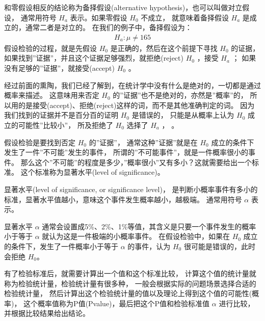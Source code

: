 \documentclass[letterpaper,10pt,english]{sphinxmanual}
\begin{document}
和零假设相反的结论称为备择假设(alternative hypothesis)，也可以叫做对立假设，
通常用符号 \(H_a\) 表示。如果零假设 \(H_0\) 不成立，
就意味着备择假设 \(H_a\) 是成立的，通常二者是对立的。
在我们的例子中，备择假设为：
\begin{equation}\label{equation:推断与检验/content:推断与检验/content:84}
\begin{split}H_a: \mu \neq 165\end{split}
\end{equation}
假设检验的过程，就是先假设 \(H_0\) 是正确的，然后在这个前提下寻找  \(H_0\) 的证据，
如果找到”证据”，并且这个证据足够强烈，就拒绝(reject) \(H_0\) ，接受 \(H_a\) ；
如果没有足够的”证据”，就接受(accept) \(H_0\) 。

经过前面的熏陶，我们已经了解到，在统计学中没有什么是绝对的，一切都是通过概率来描述。
这意味用来否定 \(H_0\) 的”证据”也不是绝对的，亦然是”概率”的，
所以用的是接受(accept)、拒绝(reject)这样的词，而不是其他准确判定的词。
因为我们找到的证据并不是百分百的证明 \(H_0\) 是错误的，
只能是从概率上认为 \(H_0\) 成立的可能性”比较小”，
所及拒绝了 \(H_0\) 选择了  \(H_a\) ，
。


假设检验是要找到否定 \(H_0\) 的”证据”，
通常这种”证据”就是在 \(H_0\) 成立的条件下发生了一件”不可能”发生的事件，
所谓的”不可能事件”，就是一件概率很小的事件。
那么这个”不可能”的程度是多少，”概率很小”又有多小？这就需要给出一个标准。
这个标准称为显著水平(level of significance)。

\begin{sphinxShadowBox}

显著水平(level of significance, or significance level)，
是判断小概率事件有多小的标准，显著水平值越小，意味这个事件发生概率越小，越极端。
通常用符号 \(\alpha\) 表示。
\end{sphinxShadowBox}

显著水平 \(\alpha\) 通常会设置成5\%、2\%、1\%等值，其含义是只要一个事件发生的概率小于等于
\(\alpha\) 就认为这是一件极端的小概率事件。
在假设检验中，如果在 \(H_0\) 成立的条件下，发生了一件概率小于等于 \(\alpha\)
的事件，认为 \(H_0\) 很可能是错误的，此时会拒绝 \(H_0\)。


有了检验标准后，就需要计算出一个值和这个标准比较，
计算这个值的统计量就称为检验统计量，检验统计量有很多种，
一般会根据实际的问题场景选择合适的检验统计量，
然后计算出这个检验统计量的值以及理论上得到这个值的可能性(概率)，
这个概率值称为P值(P\sphinxhyphen{}value)，最后把这个P值和检验标准值 \(\alpha\)
进行比较，并根据比较结果给出结论。
\end{document}
